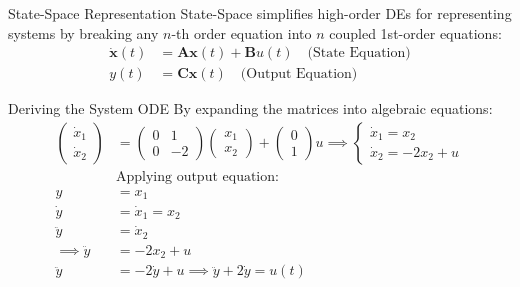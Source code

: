 \documentclass{beamer}
\theoremstyle{remark}
\newcommand{\myvec}[1]{\ensuremath{\begin{pmatrix}#1\end{pmatrix}}}
\let\vec\mathbf
\numberwithin{equation}{section}
\begin{document}
\begin{frame}{State-Space Representation}
        State-Space simplifies high-order DEs for representing systems by breaking any $n$-th order equation into $n$ coupled 1st-order equations:
        \begin{align}
            \dot{\vec{x}}(t) &= \vec{A}\vec{x}(t) + \vec{B}u(t) \quad \text{(State Equation)} \\
            y(t) &= \vec{C}\vec{x}(t) \quad \text{(Output Equation)}
        \end{align}
\end{frame}
\begin{frame}{Deriving the System ODE}
        By expanding the matrices into algebraic equations:
        \begin{align}
            \myvec{\dot{x}_1 \\ \dot{x}_2} &= \myvec{0 & 1 \\ 0 & -2}\myvec{x_1 \\ x_2} + \myvec{0 \\ 1}u \implies \begin{cases} \dot{x}_1 = x_2 \\ \dot{x}_2 = -2x_2 + u \end{cases} \\
                                           &\text{Applying output equation:} \\
            y &= x_1 \\
            \dot{y} &= \dot{x}_1 = x_2 \\
            \ddot{y} &= \dot{x}_2 \\
            \implies \ddot{y} &= -2x_2 + u \\
            \ddot{y} &= -2\dot{y} + u \implies \ddot{y} + 2\dot{y} = u(t)
        \end{align}
\end{frame}
\end{document}
